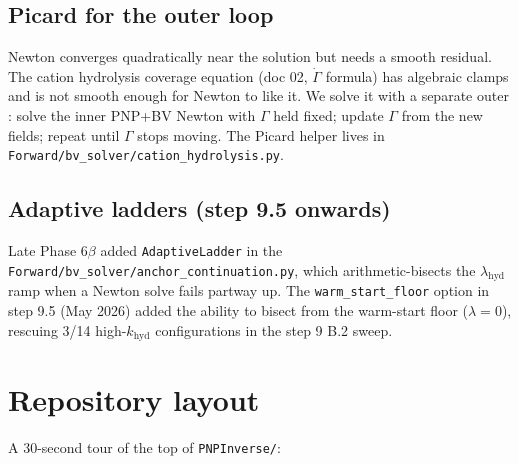 \documentclass[11pt]{article}
\begin{document}
\subsection{Picard for the outer loop}

Newton converges quadratically near the solution but needs a smooth
residual. The cation hydrolysis coverage equation
(doc 02, $\dot\Gamma$ formula) has algebraic clamps and is not smooth
enough for Newton to like it. We solve it with a separate outer
: solve the inner PNP+BV Newton with
$\Gamma$ held fixed; update $\Gamma$ from the new fields; repeat
until $\Gamma$ stops moving. The Picard helper lives in
\texttt{Forward/bv\_solver/cation\_hydrolysis.py}.

\subsection{Adaptive ladders (step 9.5 onwards)}

Late Phase 6$\beta$ added \texttt{AdaptiveLadder} in the
\texttt{Forward/bv\_solver/anchor\_continuation.py}, which
arithmetic-bisects the $\lambda_{\mathrm{hyd}}$ ramp when a Newton
solve fails partway up. The
\texttt{warm\_start\_floor} option in step 9.5 (May 2026) added
the ability to bisect from the warm-start floor ($\lambda = 0$),
rescuing 3/14 high-$k_{\mathrm{hyd}}$ configurations in the step 9
B.2 sweep.

\section{Repository layout}

A 30-second tour of the top of \texttt{PNPInverse/}:
\end{document}
